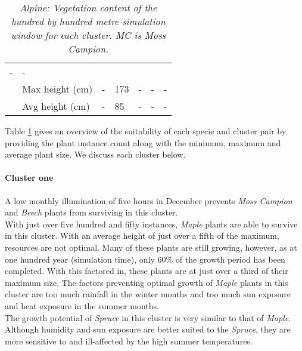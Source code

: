 \begin{table}[htb!]
\begin{tabular}{|p{2cm}|p{2cm}|p{1.5cm}|p{1.5cm}|p{1.5cm}|p{1.5cm}|p{1.5cm}|}
						\multicolumn{1}{l|}{-} & 
						\multicolumn{1}{l|}{-} \\\cline{2-7} &
						\multicolumn{1}{l|}{Max height (cm)} & 
						\multicolumn{1}{l|}{-} &
						\multicolumn{1}{l|}{173} & 
						\multicolumn{1}{l|}{-} &
						\multicolumn{1}{l|}{-} & 
						\multicolumn{1}{l|}{-} \\\cline{2-7} &
						\multicolumn{1}{l|}{Avg height (cm)} & 
						\multicolumn{1}{l|}{-} &
						\multicolumn{1}{l|}{85} & 
						\multicolumn{1}{l|}{-} &
						\multicolumn{1}{l|}{-} & 
						\multicolumn{1}{l|}{-} \\\cline{2-7}
		\hline                                                       
		\end{tabular}
	\caption{\textit{Alpine: Vegetation content of the hundred by hundred metre simulation window for each cluster. MC is Moss Campion.}}
	\label{tab:results_alpine_species_cluster_properties}	
\end{table}

Table \ref{tab:results_alpine_species_cluster_properties} gives an overview of the suitability of each specie and cluster pair by providing the plant instance count along with the minimum, maximum and average plant size. We discuss each cluster below.\\

\paragraph{Cluster one}

A low monthly illumination of five hours in December prevents \textit{Moss Campion} and \textit{Beech} plants from surviving in this cluster.\\
With just over five hundred and fifty instances, \textit{Maple} plants are able to survive in this cluster. With an average height of just over a fifth of the maximum, resources are not optimal. Many of these plants are still growing, however, as at one hundred year (simulation time), only 60\% of the growth period has been completed. With this factored in, these plants are at just over a third of their maximum size. The factors preventing optimal growth of \textit{Maple} plants in this cluster are too much rainfall in the winter months and too much sun exposure and heat exposure in the summer months.\\
The growth potential of \textit{Spruce} in this cluster is very similar to that of \textit{Maple}. Although humidity and sun exposure are better suited to the \textit{Spruce}, they are more sensitive to and ill-affected by the high summer temperatures.

